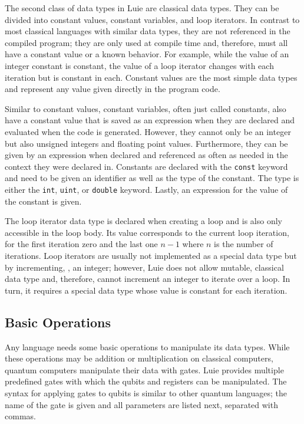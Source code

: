 The second class of data types in Luie are classical data types. They can be divided into constant values, constant variables, and loop iterators. In contrast to most classical languages with similar data types, they are not referenced in the compiled program; they are only used at compile time and, therefore, must all have a constant value or a known behavior. For example, while the value of an integer constant is constant, the value of a loop iterator changes with each iteration but is constant in each.  
Constant values are the most simple data types and represent any value given directly in the program code. 

Similar to constant values, constant variables, often just called constants, also have a constant value that is saved as an expression when they are declared and evaluated when the code is generated. However, they cannot only be an integer but also unsigned integers and floating point values. Furthermore, they can be given by an expression when declared and referenced as often as needed in the context they were declared in. Constants are declared with the \texttt{const} keyword and need to be given an identifier as well as the type of the constant. The type is either the \texttt{int}, \texttt{uint}, or \texttt{double} keyword. Lastly, an expression for the value of the constant is given.  

The loop iterator data type is declared when creating a loop and is also only accessible in the loop body. Its value corresponds to the current loop iteration, \eg for the first iteration zero and the last one $n - 1$ where $n$ is the number of iterations. Loop iterators are usually not implemented as a special data type but by incrementing, \eg, an integer; however, Luie does not allow mutable, classical data type and, therefore, cannot increment an integer to iterate over a loop. In turn, it requires a special data type whose value is constant for each iteration. 

\subsection{Basic Operations}
\label{sec:concept_basicOperations}
Any language needs some basic operations to manipulate its data types. While these operations may be addition or multiplication on classical computers, quantum computers manipulate their data with gates. Luie provides multiple predefined gates with which the qubits and registers can be manipulated. The syntax for applying gates to qubits is similar to other quantum languages; the name of the gate is given and all parameters are listed next, separated with commas. 

